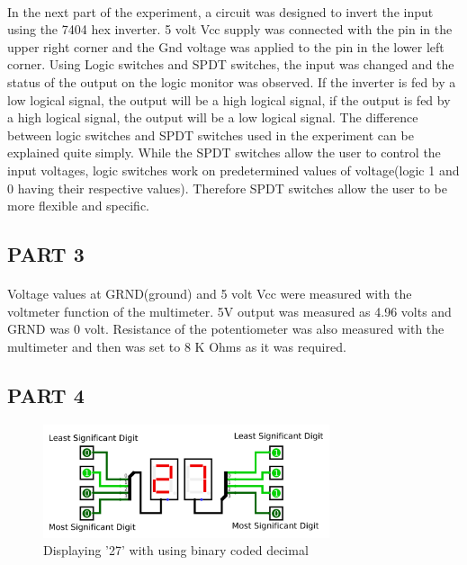 \documentclass[pdftex,12pt,a4paper]{article}
\begin{document}
\begin{flushleft}
\paragraph{}
In the next part of the experiment, a circuit was designed to invert the input using the 7404 hex inverter. 5 volt Vcc supply was connected with the pin in the upper right corner and the Gnd voltage was applied to the pin in the lower left corner. Using Logic switches and SPDT switches, the input was changed and the status of the output on the logic monitor was observed. If the inverter is fed by a low logical signal, the output will be a high logical signal, if the output is fed by a high logical signal, the output will be a low logical signal. The difference between logic switches and SPDT switches used in the experiment can be explained quite simply. While the SPDT switches allow the user to control the input voltages, logic switches work on predetermined values of voltage(logic 1 and 0 having their respective values). Therefore SPDT switches allow the user to be more flexible and specific.
\end{flushleft}



\begin{flushleft}
\subsection{PART 3}
\end{flushleft}
\begin{flushleft}
\paragraph{}
Voltage values at GRND(ground) and 5 volt Vcc were measured with the voltmeter function of the multimeter. 5V output was measured as 4.96 volts and GRND was 0 volt. Resistance of the potentiometer was also measured with the multimeter and then was set to 8 K Ohms as it was required.
\end{flushleft}

\begin{flushleft}
\subsection{PART 4}
\end{flushleft}

\begin{figure}[ht]
	\centering
	\includegraphics[width=0.75\textwidth]{part4_800.png}	
	\caption{Displaying '27' with using binary coded decimal}
	\label{fig3}
\end{figure}
\end{document}
